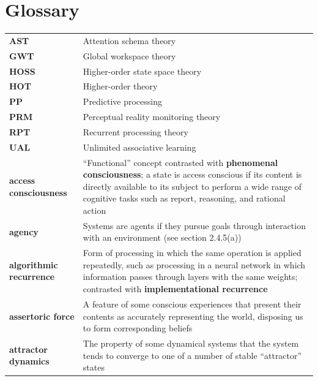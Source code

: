 \documentclass[12pt]{article}
\begin{document}
\newpage

\section*{Glossary}

\begin{longtable}{|>{\raggedright\arraybackslash}p{}|>{\raggedright\arraybackslash}p{}|}
\hline
\rowcolor{black} 
\multicolumn{1}{|c|}{\textcolor{white}{\textbf{Term}}} & \multicolumn{1}{c|}{\textcolor{white}{\textbf{Description}}} \\
\hline
\endhead
\textbf{AST} & Attention schema theory \\
\hline
\textbf{GWT} & Global workspace theory \\
\hline
\textbf{HOSS} & Higher-order state space theory \\
\hline
\textbf{HOT} & Higher-order theory \\
\hline
\textbf{PP} & Predictive processing \\
\hline
\textbf{PRM} & Perceptual reality monitoring theory \\
\hline
\textbf{RPT} & Recurrent processing theory \\
\hline
\textbf{UAL} & Unlimited associative learning \\
\hline
\textbf{access consciousness} & ``Functional'' concept contrasted with \textbf{phenomenal consciousness}; a state is access conscious if its content is directly available to its subject to perform a wide range of cognitive tasks such as report, reasoning, and rational action \\
\hline
\textbf{agency} & Systems are agents if they pursue goals through interaction with an environment (see section 2.4.5(a)) \\
\hline
\textbf{algorithmic recurrence} & Form of processing in which the same operation is applied repeatedly, such as processing in a neural network in which information passes through layers with the same weights; contrasted with \textbf{implementational recurrence} \\
\hline
\textbf{assertoric force} & A feature of some conscious experiences that present their contents as accurately representing the world, disposing us to form corresponding beliefs \\
\hline
\textbf{attractor dynamics} & The property of some dynamical systems that the system tends to converge to one of a number of stable ``attractor'' states \\

\end{longtable}
\end{document}
